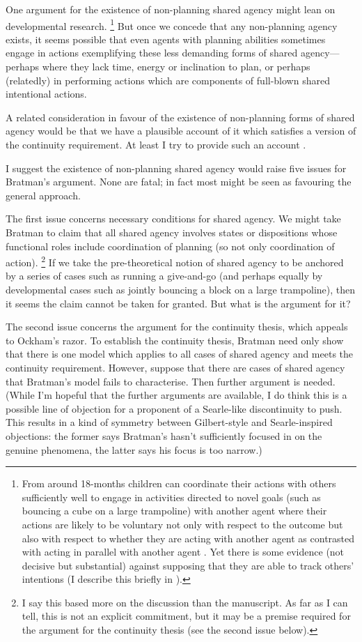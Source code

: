 \documentclass[12pt,letterpaper]{extarticle}
\begin{document}
One argument for the existence of non-planning shared agency might lean on developmental research.%
%
\footnote{\label{fn_dev}%
From around 18-months children can coordinate their actions with others sufficiently well to  engage in activities directed to novel goals (such as bouncing a cube on a large trampoline) with another agent \citep{Warneken:2006qe} where their actions are likely to be voluntary not only with respect to the outcome but also with respect to whether they are acting with another agent as contrasted with acting in parallel with another agent \citep{Grafenhain:2010zl}.
Yet there is some evidence (not decisive but substantial) against supposing that they are able to track others' intentions (I describe this briefly in \citet{Butterfill:2011fk}).
} 
%
But once we concede that any non-planning agency exists, it seems possible that even agents with planning abilities  sometimes engage in actions exemplifying these less demanding forms of shared agency---perhaps where they lack time, energy or inclination to plan, or perhaps (relatedly) in performing actions which are components of full-blown shared intentional actions.

A related consideration in favour of the existence of non-planning forms of shared agency would be that we have a plausible account of it which satisfies a version of the continuity requirement.
At least I try to provide such an account \citep{Butterfill:2011fk,Butterfill:2011_wija}.

I suggest the existence of non-planning shared agency would raise five issues for Bratman's argument.  None are fatal; in fact most might be seen as favouring the general approach.

The first issue concerns necessary conditions for shared agency. 
We might take Bratman to claim that all shared agency involves states or dispositions whose functional roles include coordination of planning (so not only coordination of action).%
\footnote{
I say this based more on the discussion than the manuscript.
As far as I can tell, this is not an explicit commitment, but it may be a premise required for the argument for the continuity thesis (see the second issue below).
}
If we take the pre-theoretical notion of shared agency to be anchored by a series of cases such as running a give-and-go (and perhaps equally by developmental cases such as jointly bouncing a block on a large trampoline), then it seems the claim cannot be taken for granted.
But what is the argument for it?

The second issue concerns the argument for the continuity thesis, which appeals to Ockham's razor.
To establish the continuity thesis, Bratman need only show that there is one model which applies to all cases of shared agency and meets the continuity requirement.
However, suppose that there are cases of shared agency that Bratman's model fails to characterise.
Then further argument is needed. 
(While I'm hopeful that the further arguments are available, I do think this is a possible line of objection for a proponent of a Searle-like discontinuity to push.
This results in a kind of symmetry between Gilbert-style and Searle-inspired objections: the former says Bratman's hasn't sufficiently focused in on the genuine phenomena, the latter says his focus is too narrow.)
\end{document}
